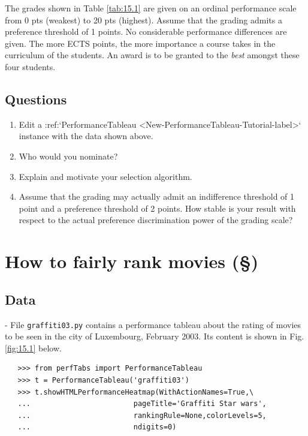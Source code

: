 The grades shown in Table \ref{tab:15.1} are given on an ordinal performance scale from 0 pts (weakest) to 20 pts (highest). Assume that the grading admits a preference threshold of 1 points. No considerable performance differences are given. The more ECTS points, the more importance a course takes in the curriculum of the students. An award is to be granted to the \emph{best} amongst these four students.

\subsection{Questions}
\label{sec:15.1.2}

\begin{enumerate}
\item Edit a :ref:`PerformanceTableau <New-PerformanceTableau-Tutorial-label>` instance with the data shown above. 
\item Who would you nominate?
\item Explain and motivate your selection algorithm.
\item Assume that the grading may actually admit an indifference threshold of 1 point and a preference threshold of 2 points. How stable is your result with respect to the actual preference discrimination power of the grading scale?
\end{enumerate}

\section{How to fairly rank movies (§)}
\label{sec:15.2}

\subsection{Data}
\label{15.2.1}

- File \texttt{graffiti03.py}  contains a performance tableau about the rating of movies to be seen in the city of Luxembourg, February 2003. Its content is shown in Fig. \ref{fig:15.1} below.

\begin{lstlisting}
   >>> from perfTabs import PerformanceTableau
   >>> t = PerformanceTableau('graffiti03')
   >>> t.showHTMLPerformanceHeatmap(WithActionNames=True,\
   ...                        pageTitle='Graffiti Star wars',
   ...                        rankingRule=None,colorLevels=5,
   ...                        ndigits=0)   
\end{lstlisting}

